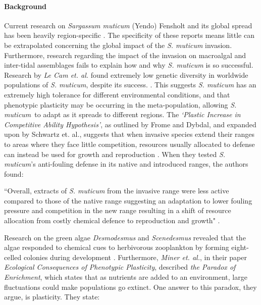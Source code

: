 \documentclass[12pt]{extarticle}
\newcommand\x{\textit{S. muticum}}
\begin{document}
\paragraph{Background}
Current research on \textit{Sargassum muticum} (Yendo) Fensholt and its global spread has been heavily region-specific \cite{Britton-Simmons2004, Staehr2000, Sanchez2005}. The specificity of these reports means little can be extrapolated  concerning the global impact of the \textit{S. muticum} invasion. Furthermore,  research regarding the impact of the invasion on macroalgal and inter-tidal assemblages  fails to explain how and why \textit{S. muticum} is so successful. Research by \textit{Le Cam et. al.} found extremely low genetic diversity in worldwide populations of \textit{S. muticum}, despite its success. \cite{LeCam2019}. This suggests \textit{S. muticum} has an extremely high tolerance for different environmental conditions, and that  phenotypic plasticity may be occurring in the meta-population, allowing \x\ to adapt as it spreads to different regions. The \textit{`Plastic Increase in Competitive Ability Hypothesis’}, as outlined by Frome and Dybdal, and expanded upon by Schwartz et. al., suggests that when invasive species extend their ranges to areas where they face little competition, resources usually allocated to defense can instead be used for growth and reproduction \cite{EmblidgeFromme2006}. When they tested \textit{S. muticum}'s anti-fouling defense in its native and introduced ranges, the authors found:
\begin{displayquote}
``Overall, extracts of \textit{S. muticum} from the invasive range were less active compared to those of the native range suggesting an adaptation to lower fouling pressure and competition in the new range resulting in a shift of resource allocation from costly chemical defence to reproduction and growth" \cite{Schwartz2017}.
\end{displayquote}
 Research on the green algae \textit{Desmodesmus} and
\textit{Scenedesmus} revealed that the algae responded to chemical cues to herbivorous zooplankton by forming eight-celled colonies during development \cite{Lurling2003}. Furthermore, \textit{Miner et. al.}, in their paper \textit{Ecological Consequences of Phenotypic Plasticity}, described \textit{the Paradox of Enrichment}, which states that as nutrients are added to an environment, large fluctuations could make populations go extinct. One answer to this paradox, they argue, is plasticity. They state:
\end{document}

